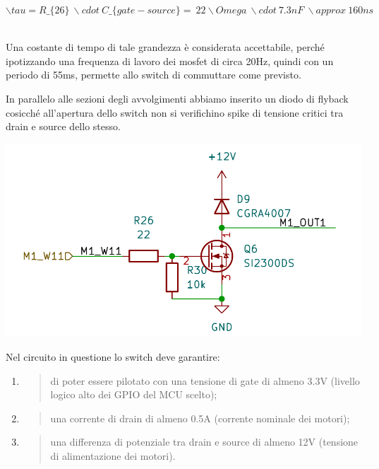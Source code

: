 \(\backslash tau = R\_\{ 26\}\ \backslash cdot\ C\_\{ gate - source\} = \ 22\backslash Omega\ \backslash cdot\ 7.3nF\ \backslash approx\ 160ns\)\(\)

Una costante di tempo di tale grandezza è considerata accettabile,
perché ipotizzando una frequenza di lavoro dei mosfet di circa 20Hz,
quindi con un periodo di 55ms, permette allo switch di commuttare come
previsto.

In parallelo alle sezioni degli avvolgimenti abbiamo inserito un diodo di
flyback cosicché all'apertura dello switch non si verifichino spike di
tensione critici tra drain e source dello stesso.

\begin{center}
\includegraphics[scale=0.5]{figures/image63.png}
\captionsetup{type=figure}
\end{center}

Nel circuito in questione lo switch deve garantire:

\begin{enumerate}
\def\labelenumi{\arabic{enumi}.}
\item
  \begin{quote}
  di poter essere pilotato con una tensione di gate di almeno 3.3V
  (livello logico alto dei GPIO del MCU scelto);
  \end{quote}
\item
  \begin{quote}
  una corrente di drain di almeno 0.5A (corrente nominale dei motori);
  \end{quote}
\item
  \begin{quote}
  una differenza di potenziale tra drain e source di almeno 12V
  (tensione di alimentazione dei motori).
  \end{quote}
\end{enumerate}

